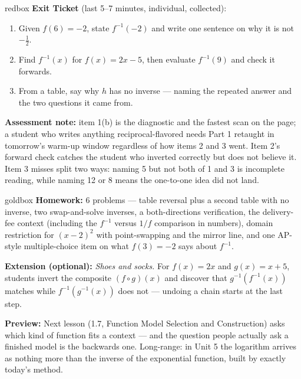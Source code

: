\documentclass[10pt]{article}
\begin{document}
\begin{skillbox}{redbox}
\textbf{Exit Ticket} (last 5--7 minutes, individual, collected):
\begin{enumerate}
  \item Given $f(6) = -2$, state $f^{-1}(-2)$ and write one sentence on why it
        is not $-\tfrac{1}{2}$.
  \item Find $f^{-1}(x)$ for $f(x) = 2x - 5$, then evaluate $f^{-1}(9)$ and
        check it forwards.
  \item From a table, say why $h$ has no inverse --- naming the repeated answer
        and the two questions it came from.
\end{enumerate}
\textbf{Assessment note:} item 1(b) is the diagnostic and the fastest scan on
the page; a student who writes anything reciprocal-flavored needs Part 1
retaught in tomorrow's warm-up window regardless of how items 2 and 3 went.
Item 2's forward check catches the student who inverted correctly but does not
believe it. Item 3 misses split two ways: naming 5 but not both of 1 and 3 is
incomplete reading, while naming 12 or 8 means the one-to-one idea did not land.
\end{skillbox}

\begin{skillbox}{goldbox}
\textbf{Homework:} 6 problems --- table reversal plus a second table with no
inverse, two swap-and-solve inverses, a both-directions verification, the
delivery-fee context (including the $f^{-1}$ versus $1/f$ comparison in
numbers), domain restriction for $(x-2)^2$ with point-swapping and the mirror
line, and one AP-style multiple-choice item on what $f(3) = -2$ says about
$f^{-1}$.

\textbf{Extension (optional):} \textit{Shoes and socks.} For $f(x) = 2x$ and
$g(x) = x+5$, students invert the composite $(f \circ g)(x)$ and discover that
$g^{-1}(f^{-1}(x))$ matches while $f^{-1}(g^{-1}(x))$ does not --- undoing a
chain starts at the last step.

\textbf{Preview:} Next lesson (1.7, Function Model Selection and Construction)
asks which kind of function fits a context --- and the question people actually
ask a finished model is the backwards one. Long-range: in Unit 5 the logarithm
arrives as nothing more than the inverse of the exponential function, built by
exactly today's method.
\end{skillbox}
\end{document}
